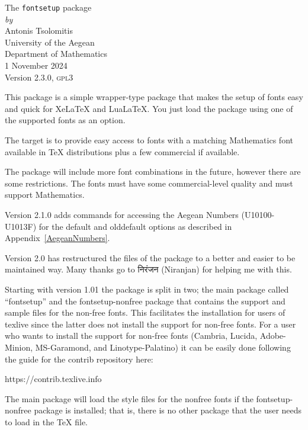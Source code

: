 \documentclass{book}
\begin{document}
  \begin{center}
    {\LARGE The \texttt{fontsetup} package}\\[1ex]
    \textit{by}\\[1ex]
    {\large Antonis Tsolomitis}\\
University of the Aegean\\ Department of Mathematics\\[1ex]
	  \textsc{1} November \textsc{2024}\\[1ex]
	  Version 2.3.0, \textsc{gpl3}
  \end{center}

This package is a simple wrapper-type package that makes the setup of fonts easy and
  quick for XeLaTeX and LuaLaTeX. You just load the package using one of the supported
  fonts as an option.

  The target is to provide easy access to fonts with a matching Mathematics font available in
  TeX distributions plus a few commercial if available.

  The package will include more font combinations in the future, however there are
  some restrictions. The fonts must have some commercial-level quality and must support
  Mathematics.

  Version 2.1.0 adds commands for accessing the Aegean Numbers (U10100-U1013F) for
  the default and olddefault options as described in Appendix~\ref{AegeanNumbers}.
  
  Version 2.0 has restructured the files of the package to a better and easier to be maintained
  way. Many thanks go to {\devfont निरंजन} (Niranjan) for helping me with this.
  
  Starting with version 1.01 the package is split in two; the main package called ``fontsetup''
  and the fontsetup-nonfree package that contains the support and sample files for the
  non-free fonts. This facilitates the installation for users of texlive since the latter does not
  install the support for non-free fonts. For a user who wants to install the support for
  non-free fonts (Cambria, Lucida, Adobe-Minion, MS-Garamond, and Linotype-Palatino) it can be
  easily done following the guide for the contrib repository here:

  https://contrib.texlive.info

  The main package will load the style files for the nonfree fonts if the fontsetup-nonfree
  package is installed; that is, there is no other package that the user needs to
  load in the TeX file.
  
\end{document}
